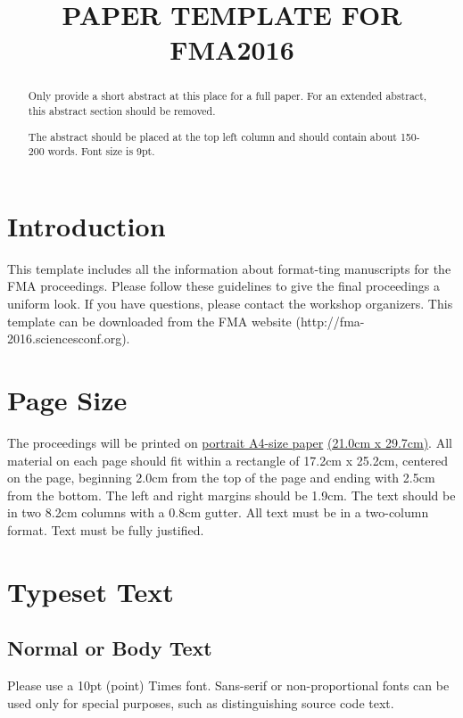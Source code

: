 \documentclass{article}
\title{PAPER TEMPLATE FOR FMA2016}
\begin{document}
%
\maketitle
%
\begin{abstract}
Only provide a short abstract at this place for a full paper. For an extended abstract, this abstract section should be removed.

The abstract should be placed at the top left column and should contain about 150-200 words. Font size is 9pt.
\end{abstract}
%
\section{Introduction}\label{sec:introduction}

This template includes all the information about format-ting manuscripts for the FMA proceedings. Please follow these guidelines to give the final proceedings a uniform look. If you have questions, please contact the workshop organizers. This template can be downloaded from the FMA website (http://fma-2016.sciencesconf.org).

\section{Page Size}\label{sec:page_size}

The proceedings will be printed on 
 \underline{portrait A4-size paper} \underline{(21.0cm x 29.7cm)}. 
All material on each page should fit within a rectangle of 17.2cm x 25.2cm, 
centered on the page, beginning 2.0cm 
from the top of the page and ending with 2.5cm from the bottom. 
The left and right margins should be 1.9cm. 
The text should be in two 8.2cm columns with a 0.8cm gutter. 
All text must be in a two-column format. 
Text must be fully justified.

\section{Typeset Text}\label{sec:typeset_text}

\subsection{Normal or Body Text}\label{subsec:body}

Please use a 10pt (point) Times font. Sans-serif or non-proportional fonts 
can be used only for special purposes, such as distinguishing source code text.
\end{document}
